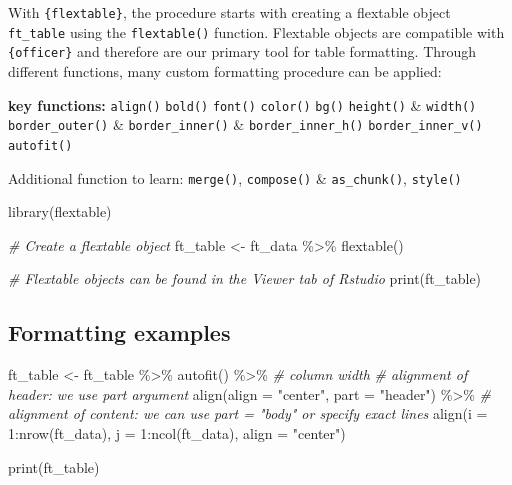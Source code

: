 \documentclass[
]{book}
\newenvironment{Shaded}{\begin{snugshade}}{\end{snugshade}}
\newcommand{\AttributeTok}[1]{\textcolor[rgb]{0.77,0.63,0.00}{#1}}
\newcommand{\CommentTok}[1]{\textcolor[rgb]{0.56,0.35,0.01}{\textit{#1}}}
\newcommand{\DecValTok}[1]{\textcolor[rgb]{0.00,0.00,0.81}{#1}}
\newcommand{\FunctionTok}[1]{\textcolor[rgb]{0.00,0.00,0.00}{#1}}
\newcommand{\NormalTok}[1]{#1}
\newcommand{\OtherTok}[1]{\textcolor[rgb]{0.56,0.35,0.01}{#1}}
\newcommand{\SpecialCharTok}[1]{\textcolor[rgb]{0.00,0.00,0.00}{#1}}
\newcommand{\StringTok}[1]{\textcolor[rgb]{0.31,0.60,0.02}{#1}}
\begin{document}
With \texttt{\{flextable\}}, the procedure starts with creating a flextable object \texttt{ft\_table} using the \texttt{flextable()} function.
Flextable objects are compatible with \texttt{\{officer\}} and therefore are our primary tool for table formatting.
Through different functions, many custom formatting procedure can be applied:

\textbf{key functions:}
\texttt{align()} \texttt{bold()} \texttt{font()} \texttt{color()} \texttt{bg()} \texttt{height()} \& \texttt{width()}
\texttt{border\_outer()} \& \texttt{border\_inner()} \& \texttt{border\_inner\_h()} \texttt{border\_inner\_v()} \texttt{autofit()}

Additional function to learn: \texttt{merge()}, \texttt{compose()} \& \texttt{as\_chunk()}, \texttt{style()}

\begin{Shaded}
\begin{Highlighting}[]
\FunctionTok{library}\NormalTok{(flextable)}

\CommentTok{\# Create a flextable object}
\NormalTok{ft\_table }\OtherTok{\textless{}{-}}\NormalTok{ ft\_data }\SpecialCharTok{\%\textgreater{}\%} 
  \FunctionTok{flextable}\NormalTok{()}

\CommentTok{\# Flextable objects can be found in the Viewer tab of Rstudio}
\FunctionTok{print}\NormalTok{(ft\_table)}
\end{Highlighting}
\end{Shaded}

\hypertarget{formatting-examples}{%
\subsection{Formatting examples}\label{formatting-examples}}

\begin{Shaded}
\begin{Highlighting}[]
\NormalTok{ft\_table }\OtherTok{\textless{}{-}}\NormalTok{ ft\_table }\SpecialCharTok{\%\textgreater{}\%}
  \FunctionTok{autofit}\NormalTok{() }\SpecialCharTok{\%\textgreater{}\%} \CommentTok{\# column width}
  \CommentTok{\# alignment of header: we use part argument}
  \FunctionTok{align}\NormalTok{(}\AttributeTok{align =} \StringTok{"center"}\NormalTok{, }\AttributeTok{part =} \StringTok{"header"}\NormalTok{) }\SpecialCharTok{\%\textgreater{}\%}
  \CommentTok{\# alignment of content: we can use part = "body" or specify exact lines }
  \FunctionTok{align}\NormalTok{(}\AttributeTok{i =} \DecValTok{1}\SpecialCharTok{:}\FunctionTok{nrow}\NormalTok{(ft\_data), }\AttributeTok{j =} \DecValTok{1}\SpecialCharTok{:}\FunctionTok{ncol}\NormalTok{(ft\_data), }\AttributeTok{align =} \StringTok{"center"}\NormalTok{) }

\FunctionTok{print}\NormalTok{(ft\_table)}
\end{Highlighting}
\end{Shaded}
\end{document}
